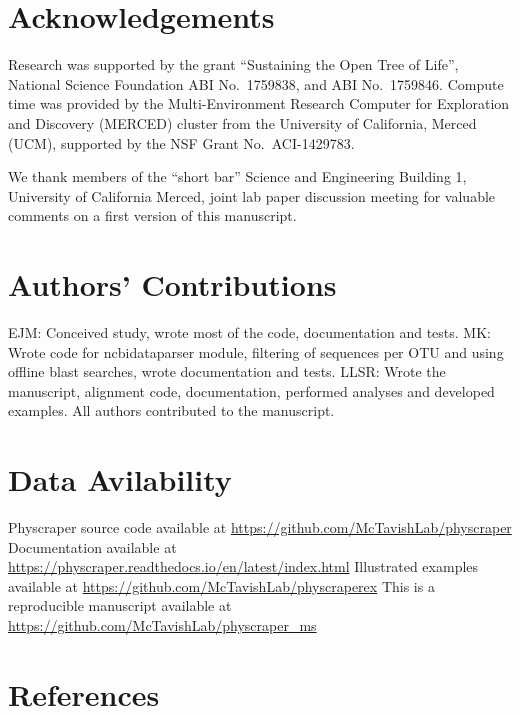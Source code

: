 \documentclass[]{article}
\begin{document}
\hypertarget{acknowledgements}{%
\section{Acknowledgements}\label{acknowledgements}}

Research was supported by the grant ``Sustaining the Open Tree of Life'', National Science Foundation ABI No.~1759838, and ABI No.~1759846.
Compute time was provided by the Multi-Environment Research Computer for Exploration and Discovery (MERCED) cluster from the University of California, Merced (UCM), supported by the NSF Grant No.~ACI-1429783.

We thank members of the ``short bar'' Science and Engineering Building 1, University of California Merced, joint lab paper discussion meeting for valuable comments on a first version of this manuscript.

\hypertarget{authors-contributions}{%
\section{Authors' Contributions}\label{authors-contributions}}

EJM: Conceived study, wrote most of the code, documentation and tests.
MK: Wrote code for ncbidataparser module, filtering of sequences per OTU and using offline blast searches, wrote documentation and tests.
LLSR: Wrote the manuscript, alignment code, documentation, performed analyses and developed examples.
All authors contributed to the manuscript.

\hypertarget{data-avilability}{%
\section{Data Avilability}\label{data-avilability}}

Physcraper source code available at \url{https://github.com/McTavishLab/physcraper}
Documentation available at \url{https://physcraper.readthedocs.io/en/latest/index.html}
Illustrated examples available at \url{https://github.com/McTavishLab/physcraperex}
This is a reproducible manuscript available at \url{https://github.com/McTavishLab/physcraper_ms}

\newpage

\hypertarget{references}{%
\section{References}\label{references}}
\end{document}
